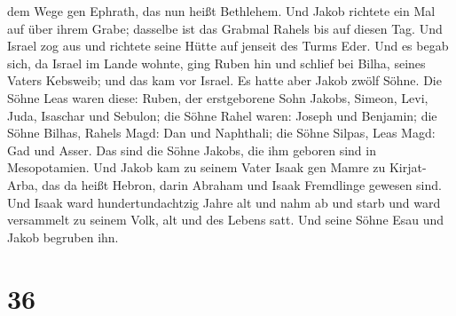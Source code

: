 dem Wege gen Ephrath, das nun heißt Bethlehem.  Und Jakob
richtete ein Mal auf über ihrem Grabe; dasselbe ist das Grabmal Rahels
bis auf diesen Tag.  Und Israel zog aus und richtete seine
Hütte auf jenseit des Turms Eder.  Und es begab sich, da
Israel im Lande wohnte, ging Ruben hin und schlief bei Bilha, seines
Vaters Kebsweib; und das kam vor Israel. Es hatte aber Jakob zwölf
Söhne.  Die Söhne Leas waren diese: Ruben, der erstgeborene
Sohn Jakobs, Simeon, Levi, Juda, Isaschar und Sebulon;  die
Söhne Rahel waren: Joseph und Benjamin;  die Söhne Bilhas,
Rahels Magd: Dan und Naphthali;  die Söhne Silpas, Leas
Magd: Gad und Asser. Das sind die Söhne Jakobs, die ihm geboren sind in
Mesopotamien.  Und Jakob kam zu seinem Vater Isaak gen
Mamre zu Kirjat-Arba, das da heißt Hebron, darin Abraham und Isaak
Fremdlinge gewesen sind.  Und Isaak ward hundertundachtzig
Jahre alt  und nahm ab und starb und ward versammelt zu
seinem Volk, alt und des Lebens satt. Und seine Söhne Esau und Jakob
begruben ihn.

\hypertarget{section-35}{%
\section{36}\label{section-35}}

